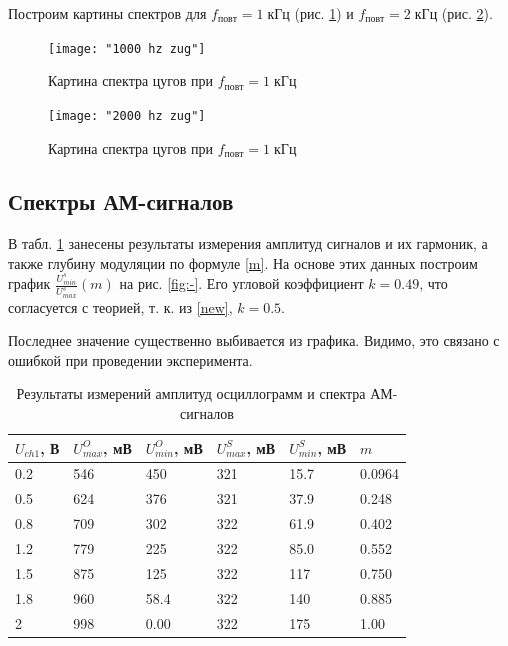 \documentclass[a4paper]{article}
\begin{document}
Построим картины спектров для $ f_{повт}  = 1\; кГц$ (рис. \ref{fig:1000-hz-zug}) и $ f_{повт}  = 2\; кГц $ (рис. \ref{fig:2000-hz-zug}).

\begin{figure}[p]
	\centering
	\texttt{[image: "1000 hz zug"]}
	\caption{Картина спектра цугов при $f_{повт} = 1\; кГц$}
	\label{fig:1000-hz-zug}
\end{figure}

\begin{figure}[p]
	\centering
	\texttt{[image: "2000 hz zug"]}
	\caption{Картина спектра цугов при $f_{повт} = 1\; кГц$}
	\label{fig:2000-hz-zug}
\end{figure}

\subsection{Спектры АМ-сигналов}
\label{punkt}
В табл. \ref{tab:amp} занесены результаты измерения амплитуд сигналов и их гармоник, а также глубину модуляции по формуле \eqref{m}. На основе этих данных построим график $ \frac{U_{min}^s}{U_{max}^s}(m) $ на рис. \ref{fig:-}. Его угловой коэффициент $ k= 0.49 $, что согласуется с теорией, т. к. из \eqref{new}, $ k = 0.5 $. 

Последнее значение существенно выбивается из графика. Видимо, это связано с ошибкой при проведении эксперимента.

\begin{table}[h]
	\centering
	\begin{tabular}{|l|l|l|l|l|l|}
		\hline
		$U_{ch1}$, В & $U_{max}^O$, мВ & $U_{min}^O$, мВ & $U_{max}^S$, мВ & $U_{min}^S$, мВ & $m$    \\ \hline
		0.2          & 546             & 450             & 321             & 15.7            & 0.0964 \\ \hline
		0.5          & 624             & 376             & 321             & 37.9            & 0.248  \\ \hline
		0.8          & 709             & 302             & 322             & 61.9            & 0.402  \\ \hline
		1.2          & 779             & 225             & 322             & 85.0            & 0.552  \\ \hline
		1.5          & 875             & 125             & 322             & 117             & 0.750  \\ \hline
		1.8          & 960             & 58.4            & 322             & 140             & 0.885  \\ \hline
		2            & 998             & 0.00            & 322             & 175             & 1.00   \\ \hline
	\end{tabular}
	\caption{Результаты измерений амплитуд осциллограмм и спектра АМ-сигналов}
	\label{tab:amp}
\end{table}
\end{document}
